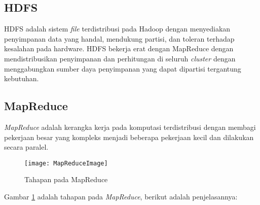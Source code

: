 \subsection{HDFS}
HDFS adalah sistem \textit{file} terdistribusi pada Hadoop dengan menyediakan penyimpanan data yang handal, mendukung partisi, dan toleran terhadap kesalahan pada hardware. HDFS bekerja erat dengan MapReduce dengan mendistribusikan penyimpanan dan perhitungan di seluruh \textit{cluster} dengan menggabungkan sumber daya penyimpanan yang dapat dipartisi tergantung kebutuhan. 

\subsection{MapReduce}
\textit{MapReduce} adalah kerangka kerja pada komputasi terdistribusi dengan membagi pekerjaan besar yang kompleks menjadi beberapa pekerjaan kecil dan dilakukan secara paralel. 

\begin{figure}[H]
	\centering
	\texttt{[image: MapReduceImage]}
	\caption{Tahapan pada MapReduce}
	\label{fig:MapReduceImage}
\end{figure}

\noindent Gambar \ref{fig:MapReduceImage} adalah tahapan pada \textit{MapReduce}, berikut adalah penjelasannya:

